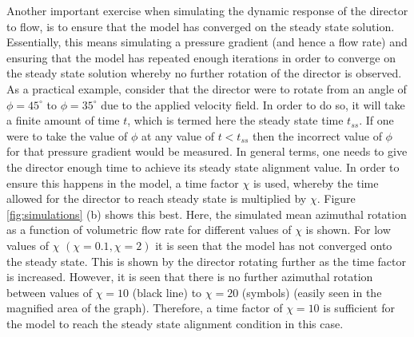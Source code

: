 Another important exercise when simulating the dynamic response of the director to flow, is to ensure that the model has converged on the steady state solution. Essentially, this means simulating a pressure gradient (and hence a flow rate) and ensuring that the model has repeated enough iterations in order to converge on the steady state solution whereby no further rotation of the director is observed. As a practical example, consider that the director were to rotate from an angle of $\phi=45^{\circ}$ to $\phi=35^{\circ}$ due to the applied velocity field. In order to do so, it will take a finite amount of time $t$, which is termed here the steady state time $t_{ss}$. If one were to take the value of $\phi$ at any value of $t<t_{ss}$ then the incorrect value of $\phi$ for that pressure gradient would be measured. In general terms, one needs to give the director enough time to achieve its steady state alignment value. In order to ensure this happens in the model, a time factor $\chi$ is used, whereby the time allowed for the director to reach steady state is multiplied by $\chi$. Figure \ref{fig:simulations} (b) shows this best. Here, the simulated mean azimuthal rotation as a function of volumetric flow rate for different values of $\chi$ is shown. For low values of $\chi$ $\left(\chi=0.1, \chi=2\right)$ it is seen that the model has not converged onto the steady state. This is shown by the director rotating further as the time factor is increased. However, it is seen that there is no further azimuthal rotation between values of $\chi=10$ (black line) to $\chi=20$ (symbols) (easily seen in the magnified area of the graph). Therefore, a time factor of $\chi=10$ is sufficient for the model to reach the steady state alignment condition in this case.


